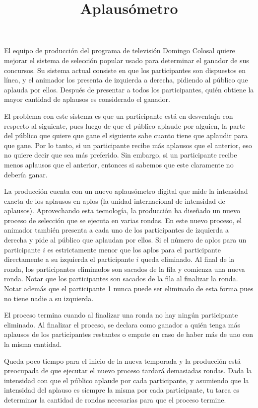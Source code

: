 \documentclass{oci}
\title{Aplausómetro}
\begin{document}
\begin{problemDescription}
El equipo de producción del programa de televisión
Domingo Colosal quiere mejorar el sistema de selección
popular usado para determinar el ganador de sus concursos.
%
Su sistema actual consiste en que los participantes
son dispuestos en línea, y el animador los presenta de
izquierda a derecha, pidiendo al público que aplauda por ellos.
%
Después de presentar a todos los participantes, quién obtiene
la mayor cantidad de aplausos es considerado el ganador.

El problema con este sistema es que
un participante está en desventaja con respecto
al siguiente, pues luego de que el público aplaude por
alguien, la parte del público que quiere que gane el siguiente
sabe cuanto tiene que aplaudir para que gane.
%
Por lo tanto, si un participante recibe más aplausos
que el anterior, eso no quiere decir que sea más preferido.
%
Sin embargo, si un participante recibe menos aplausos
que el anterior, entonces si sabemos que este claramente
no debería ganar.

La producción cuenta con un nuevo aplausómetro digital
que mide la intensidad exacta de los aplausos en aplos
(la unidad internacional de intensidad de aplausos).
%
Aprovechando esta tecnología, la producción ha diseñado
un nuevo proceso de selección que se ejecuta en varias rondas.
%
En este nuevo proceso, el animador también presenta a cada uno
de los participantes de izquierda a derecha y pide al público
que aplaudan por ellos.
%
Si el número de aplos para un participante $i$ es estrictamente
menor que los aplos para el participante directamente a
su izquierda el participante $i$ queda eliminado.
%
Al final de la ronda, los participantes eliminados son sacados
de la fila y comienza una nueva ronda.
%
Notar que los participantes son sacados de la fila al finalizar
la ronda.
%
Notar además que el participante 1 nunca puede ser eliminado
de esta forma pues no tiene nadie a su izquierda.

El proceso termina cuando al finalizar una ronda
no hay ningún participante eliminado.
%
%
Al finalizar el proceso, se declara como ganador a quién
tenga más aplausos de los participantes restantes o empate
en caso de haber más de uno con la misma cantidad.

Queda poco tiempo para el inicio de la nueva temporada
y la producción está preocupada de que ejecutar el nuevo proceso
tardará demasiadas rondas.
%
Dada la intensidad con que el público aplaude por cada participante,
y asumiendo que la intensidad del aplauso es siempre la misma por
cada participante, tu tarea es determinar la cantidad de rondas
necesarias para que el proceso termine.
\end{problemDescription}
\end{document}

